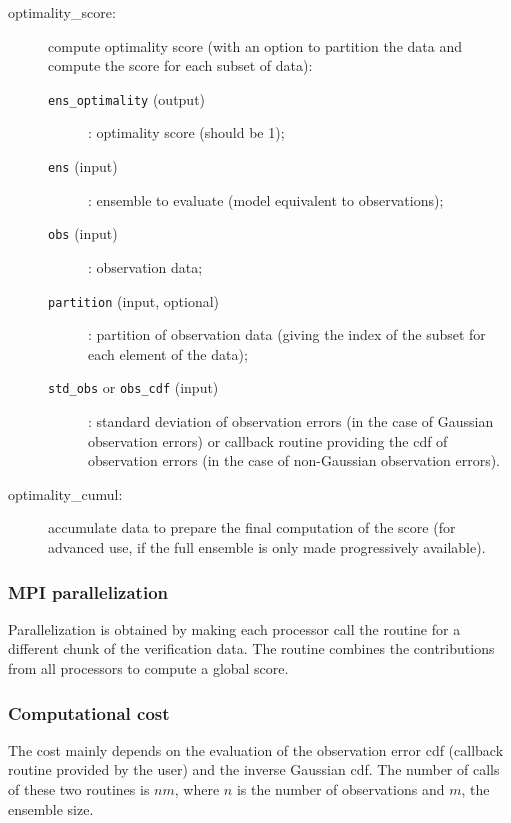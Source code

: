 \documentclass[11pt]{article}
\begin{document}
\begin{description}
\item[optimality\_score:] compute optimality score (with an option to partition the data
                    and compute the score for each subset of data):
  \begin{description}
  \item[{\tt ens\_optimality} (output)]: optimality score (should be 1);
  \item[{\tt ens} (input)]: ensemble to evaluate (model equivalent to observations);
  \item[{\tt obs} (input)]: observation data;
  \item[{\tt partition} (input, optional)]: partition of observation data
                                  (giving the index of the subset for each element of the data);
  \item[{\tt std\_obs} or {\tt obs\_cdf} (input)]: standard deviation of observation errors
                            (in the case of Gaussian observation errors) or
                            callback routine providing the cdf of observation errors
                            (in the case of non-Gaussian observation errors).
  \end{description}
\item[optimality\_cumul:] accumulate data to prepare the final computation of the score
                    (for advanced use, if the full ensemble is only made progressively available).
\end{description}

\subsubsection*{MPI parallelization}

Parallelization is obtained by making each processor call the routine
for a different chunk of the verification data.
The routine combines the contributions from all processors
to compute a global score.

\subsubsection*{Computational cost}

The cost mainly depends on the evaluation of the observation error cdf
(callback routine provided by the user) and the inverse Gaussian cdf.
The number of calls of these two routines is $n m$,
where $n$ is the number of observations and $m$, the ensemble size.
\end{document}
